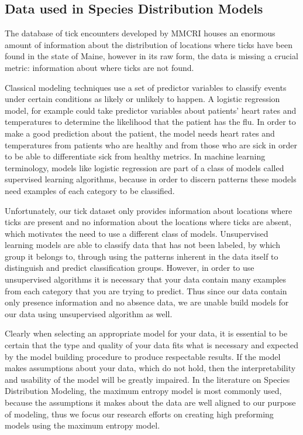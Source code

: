 \subsection{Data used in Species Distribution Models}
\noindent The database of tick encounters developed by MMCRI houses an enormous amount of information about the distribution of locations where ticks have been found in the state of Maine, however in its raw form, the data is missing a crucial metric: information about where ticks are not found. \newline

\noindent Classical modeling techniques use a set of predictor variables to classify events under certain conditions as likely or unlikely to happen. A logistic regression model, for example could take predictor variables about patients' heart rates and temperatures to determine the likelihood that the patient has the flu. In order to make a good prediction about the patient, the model needs heart rates and temperatures from patients who are healthy and from those who are sick in order to be able to differentiate sick from healthy metrics. In machine learning terminology, models like logistic regression are part of a class of models called supervised learning algorithms, because in order to discern patterns these models need examples of each category to be classified. \newline

\noindent Unfortunately, our tick dataset only provides information about locations where ticks are present and no information about the locations where ticks are absent, which motivates the need to use a different class of models. Unsupervised learning models are able to classify data that has not been labeled, by which group it belongs to, through using the patterns inherent in the data itself to distinguish and predict classification groups. However, in order to use unsupervised algorithms it is necessary that your data contain many examples from each category that you are trying to predict. Thus since our data contain only presence information and no absence data, we are unable build models for our data using unsupervised algorithm as well. \newline

\noindent Clearly when selecting an appropriate model for your data, it is essential to be certain that the type and quality of your data fits what is necessary and expected by the model building procedure to produce respectable results. If the model makes assumptions about your data, which do not hold, then the interpretability and usability of the model will be greatly impaired. In the literature on Species Distribution Modeling, the maximum entropy model is most commonly used, because the assumptions it makes about the data are well aligned to our purpose of modeling, thus we focus our research efforts on creating high preforming models using the maximum entropy model. \newline

